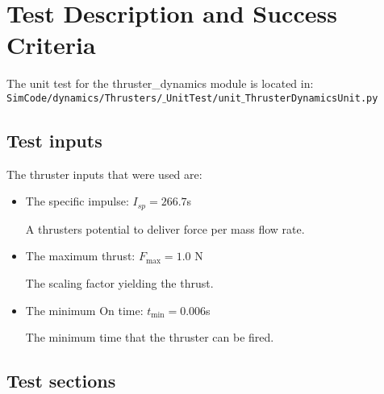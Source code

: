 \section{Test Description and Success Criteria}

The unit test for the thruster\_dynamics module is located in:\\

\noindent
{\tt SimCode/dynamics/Thrusters/$\_$UnitTest/unit$\_$ThrusterDynamicsUnit.py} \\

\subsection{Test inputs}

The thruster inputs that were used are:

\begin{itemize}
\item The specific impulse: $I_{sp} = 266.7$s 

A thrusters potential to deliver force per mass flow rate. 
\item The maximum thrust: $F_{\mathrm{max}} = 1.0$ N

The scaling factor yielding the thrust.
\item The minimum On time: $t_{\mathrm{min}} = 0.006$s

The minimum time that the thruster can be fired.
\end{itemize}

\subsection{Test sections}

